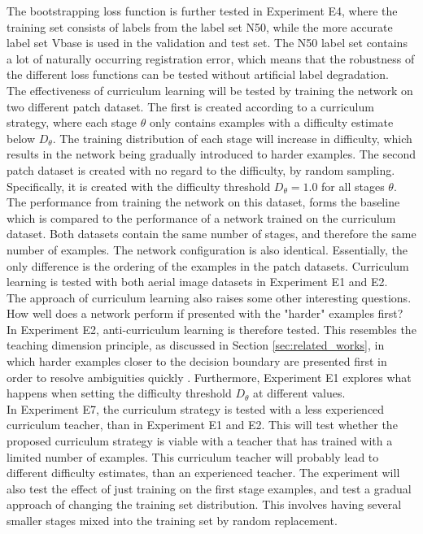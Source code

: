 The bootstrapping loss function is further tested in Experiment E4, where the training set consists of labels from the label set N50, while the more accurate label set Vbase is used in the validation and test set. The N50 label set contains a lot of naturally occurring registration error, which means that the robustness of the different loss functions can be tested without artificial label degradation.\\

The effectiveness of curriculum learning will be tested by training the network on two different patch dataset. The first is created according to a curriculum strategy, where each stage $\theta$ only contains examples with a difficulty estimate below $D_\theta$. The training distribution of each stage will increase in difficulty, which results in the network being gradually introduced to harder examples. The second patch dataset is created with no regard to the difficulty, by random sampling. Specifically, it is created with the difficulty threshold $D_\theta =1.0$ for all stages $\theta$. The performance from training the network on this dataset, forms the baseline which is compared to the performance of a network trained on the curriculum dataset. Both datasets contain the same number of stages, and therefore the same number of examples. The network configuration is also identical. Essentially, the only difference is the ordering of the examples in the patch datasets. Curriculum learning is tested with both aerial image datasets in Experiment E1 and E2.\\

The approach of curriculum learning also raises some other interesting questions. How well does a network perform if presented with the "harder" examples first? In Experiment E2, anti-curriculum learning is therefore tested. This resembles the teaching dimension principle, as discussed in Section \ref{sec:related_works}, in which harder examples closer to the decision boundary are presented first in order to resolve ambiguities quickly . Furthermore, Experiment E1 explores what happens when setting the difficulty threshold $D_\theta$ at different values.\\

In Experiment E7, the curriculum strategy is tested with a less experienced curriculum teacher, than in Experiment E1 and E2. This will test whether the proposed curriculum strategy is viable with a teacher that has trained with a limited number of examples. This curriculum teacher will probably lead to different difficulty estimates, than an experienced teacher. The experiment will also test the effect of just training on the first stage examples, and test a gradual approach of changing the training set distribution. This involves having several smaller stages mixed into the training set by random replacement.\\

